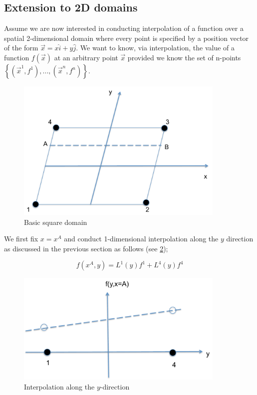 \subsection*{Extension to 2D domains}
Assume we are now interested in conducting interpolation of a function over a spatial 2-dimensional domain where every point is specified by a position vector of the form $\vec x = x\hat i + y\hat j$. We want to know, via interpolation, the value of a function $f(\vec x)$ at an arbitrary point $\vec x$ provided we know the set of n-points $\left\{ {({{\vec x}^1},{f^1}),...,({{\vec x}^n},{f^n})} \right\}$.


\begin{figure}[H]
\centering
\includegraphics[width=10cm]{img/element.pdf}
\caption{Basic square domain}
\label{fig:element}
\end{figure}

We first fix $x = {x^A}$ and conduct 1-dimensional interpolation along the $y$ direction as discussed in the previous section as follows (see \cref{fig:onedimn});

\[f({x^A},y) = {L^1}(y){f^1} + {L^4}(y){f^4}\]

\begin{figure}[H]
\centering
\includegraphics[width=10cm]{img/inter1D.pdf}
\caption{Interpolation along the $y$-direction}
\label{fig:onedimn}
\end{figure}

